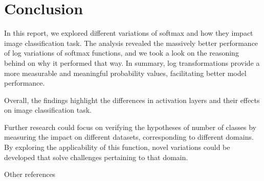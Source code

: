 \documentclass{article}
\begin{document}
\section{Conclusion}

In this report, we explored different variations of softmax and how they impact image classification task. The analysis revealed the massively better performance of log variations of softmax functions, and we took a look on the reasoning behind on why it performed that way. In summary, log transformations provide a more measurable and meaningful probability values, facilitating better model performance.

Overall, the findings highlight the differences in activation layers and their effects on image classification task.

Further research could focus on verifying the hypotheses of number of classes by measuring the impact on different datasets, corresponding to different domains. By exploring the applicability of this function, novel variations could be developed that solve challenges pertaining to that domain.

\vspace{6pt}
\vspace{6pt}

Other references
\cite{cifar100}
\cite{fast-softmax-sampling} \cite{maddison2017concrete} \cite{alitabakds_my-first-project_2023}



\end{document}
